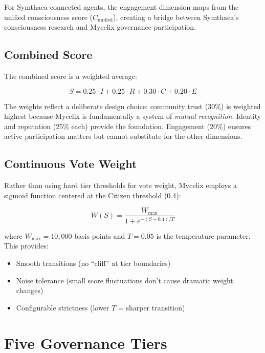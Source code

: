 \documentclass[12pt]{book}
\begin{document}
For Symthaea-connected agents, the engagement dimension maps from the unified
consciousness score ($C_{\text{unified}}$), creating a bridge between Symthaea's
consciousness research and Mycelix governance participation.

\section{Combined Score}

The combined score is a weighted average:

\begin{equation}
  S = 0.25 \cdot I + 0.25 \cdot R + 0.30 \cdot C + 0.20 \cdot E
\end{equation}

The weights reflect a deliberate design choice: community trust (30\%) is
weighted highest because Mycelix is fundamentally a system of \emph{mutual
recognition}. Identity and reputation (25\% each) provide the foundation.
Engagement (20\%) ensures active participation matters but cannot substitute
for the other dimensions.

\section{Continuous Vote Weight}

Rather than using hard tier thresholds for vote weight, Mycelix employs a
sigmoid function centered at the Citizen threshold (0.4):

\begin{equation}
  W(S) = \frac{W_{\max}}{1 + e^{-(S - 0.4) / T}}
\end{equation}

where $W_{\max} = 10{,}000$ basis points and $T = 0.05$ is the temperature
parameter. This provides:

\begin{itemize}
  \item Smooth transitions (no ``cliff'' at tier boundaries)
  \item Noise tolerance (small score fluctuations don't cause dramatic weight changes)
  \item Configurable strictness (lower $T$ = sharper transition)
\end{itemize}


\chapter{Five Governance Tiers}
\end{document}
